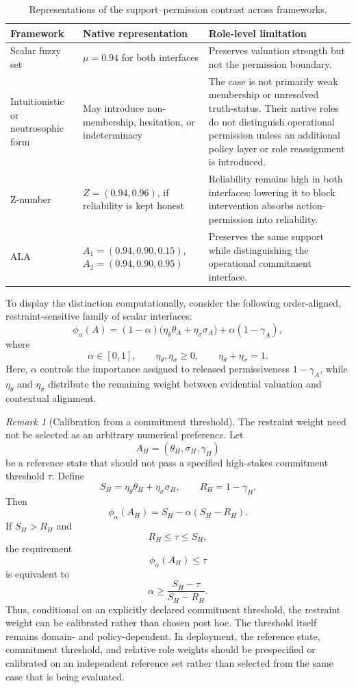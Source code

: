 \documentclass[reqno,final]{amsart}
\theoremstyle{definition}
\theoremstyle{plain}
\theoremstyle{remark}
\newtheorem{remark}{Remark}
\begin{document}
\begin{table}[!htbp]
\centering
\caption{Representations of the support--permission contrast across frameworks.}
\label{tab:case-framework-comparison}
\fontsize{10}{12}\selectfont
\setlength{\tabcolsep}{3pt}
\renewcommand{\arraystretch}{1.14}
\begin{tabular}{>{\raggedright\arraybackslash}p{}>{\raggedright\arraybackslash}p{}>{\raggedright\arraybackslash}p{}}
\toprule
Framework & Native representation & Role-level limitation \\
\midrule
Scalar fuzzy set & \(\mu=0.94\) for both interfaces & Preserves valuation strength but not the permission boundary. \\
Intuitionistic or neutrosophic form & May introduce non-membership, hesitation, or indeterminacy & The case is not primarily weak membership or unresolved truth-status. Their native roles do not distinguish operational permission unless an additional policy layer or role reassignment is introduced. \\
Z-number & \(Z=(0.94,0.96)\), if reliability is kept honest & Reliability remains high in both interfaces; lowering it to block intervention absorbs action-permission into reliability. \\
ALA & \(A_1=(0.94,0.90,0.15)\), \(A_2=(0.94,0.90,0.95)\) & Preserves the same support while distinguishing the operational commitment interface. \\
\bottomrule
\end{tabular}
\end{table}
To display the distinction computationally, consider the following
order-aligned, restraint-sensitive family of scalar interfaces:
\[
\phi_\alpha(A)
=
(1-\alpha)
\bigl(
\eta_\theta\theta_A+\eta_\sigma\sigma_A
\bigr)
+
\alpha(1-\gamma_A),
\]
where
\[
\alpha\in[0,1],
\qquad
\eta_\theta,\eta_\sigma\geq 0,
\qquad
\eta_\theta+\eta_\sigma=1.
\]
Here, \(\alpha\) controls the importance assigned to released
permissiveness \(1-\gamma_A\), while
\(\eta_\theta\) and \(\eta_\sigma\) distribute the remaining weight
between evidential valuation and contextual alignment.

\begin{remark}[Calibration from a commitment threshold]
The restraint weight need not be selected as an arbitrary numerical
preference. Let
\[
A_H=(\theta_H,\sigma_H,\gamma_H)
\]
be a reference state that should not pass a specified high-stakes
commitment threshold \(\tau\). Define
\[
S_H
=
\eta_\theta\theta_H+\eta_\sigma\sigma_H,
\qquad
R_H=1-\gamma_H.
\]
Then
\[
\phi_\alpha(A_H)
=
S_H-\alpha(S_H-R_H).
\]
If \(S_H>R_H\) and
\[
R_H\leq\tau\leq S_H,
\]
the requirement
\[
\phi_\alpha(A_H)\leq\tau
\]
is equivalent to
\[
\alpha
\geq
\frac{S_H-\tau}{S_H-R_H}.
\]
Thus, conditional on an explicitly declared commitment threshold,
the restraint weight can be calibrated rather than chosen
post hoc. The threshold itself remains domain- and policy-dependent.
In deployment, the reference state, commitment threshold, and relative
role weights should be prespecified or calibrated on an independent
reference set rather than selected from the same case that is being
evaluated.
\end{remark}
\end{document}
